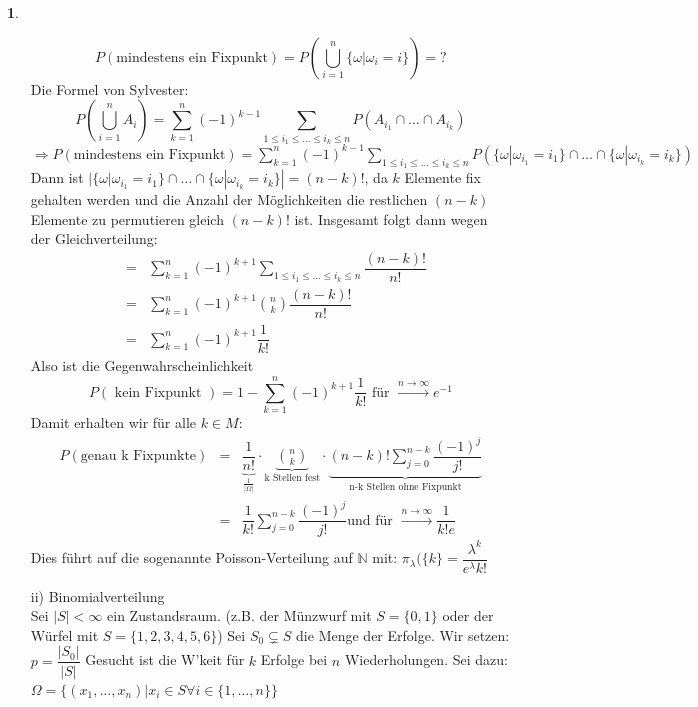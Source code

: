 \documentclass[10pt,a4paper]{report}
\numberwithin{equation}{section}
\numberwithin{figure}{section}
\theoremstyle{plain}
\theoremstyle{definition}
\newtheorem{example}[thm]{\protect\examplename}
\theoremstyle{remark}
\theoremstyle{plain}
\providecommand{\examplename}{Beispiel}
\newcommand{\1}{ \mathbb{1} } %
\begin{document}
\begin{example}
\begin{itemize}
    \[P(\text{mindestens ein Fixpunkt})=P\left(\bigcup\limits_{i=1}^n \{\omega|\omega_i=i\}\right)=?\]
    Die Formel von Sylvester:
    \[P\left(\bigcup\limits_{i=1}^nA_i\right)=\sum\limits_{k=1}^n(-1)^{k-1}\sum\limits_{1\leq i_1 \leq \dots \leq i_k \leq n}P(A_{i_1}\cap\dots\cap A_{i_k})\]
    $\Rightarrow P(\text{mindestens ein Fixpunkt})
    =\sum\limits_{k=1}^n(-1)^{k-1}\sum\limits_{1\leq i_1 \leq \dots \leq i_k \leq n}P(\{\omega|\omega_{i_1}=i_1\}\cap\dots\cap \{\omega|\omega_{i_k}=i_k\})$
    Dann ist $|\{\omega|\omega_{i_1}=i_1\}\cap\dots\cap
    \{\omega|\omega_{i_k}=i_k\}|=(n-k)!$, da $k$ Elemente fix gehalten
    werden und die Anzahl der Möglichkeiten die restlichen $(n-k)$
    Elemente zu permutieren gleich $(n-k)!$ ist. Insgesamt folgt dann
    wegen der Gleichverteilung:
    \begin{eqnarray*}
      &=&\sum\limits_{k=1}^n(-1)^{k+1}\sum\limits_{1\leq i_1 \leq \dots \leq i_k \leq n}\dfrac{(n-k)!}{n!}\\
      &=&\sum\limits_{k=1}^n(-1)^{k+1}\binom{n}{k}\dfrac{(n-k)!}{n!}\\
      &=&\sum\limits_{k=1}^n(-1)^{k+1}\dfrac{1}{k!}
    \end{eqnarray*}
    Also ist die Gegenwahrscheinlichkeit
    \[P(\text{ kein Fixpunkt })=1-\sum\limits_{k=1}^n(-1)^{k+1}\dfrac{1}{k!}\text{ für } \overset{n \to \infty}{\rightarrow} e^{-1}\]
    Damit erhalten wir für alle $k \in M$:
    \begin{eqnarray*}
      P(\text{genau k
        Fixpunkte})&=&\underbrace{\dfrac{1}{n!}}_\frac{1}{|\Omega|}\cdot
      \underbrace{\binom{n}{k}}_{\text{k Stellen fest}}\cdot
      \underbrace{(n-k)!\sum\limits_{j=0}^{n-k}\dfrac{(-1)^j}{j!}}_{\text{n-k
          Stellen ohne Fixpunkt}} \\
      &=&\dfrac{1}{k!}\sum\limits_{j=0}^{n-k}\dfrac{(-1)^j}{j!}\text{
        und für }\overset{n \to \infty}{\rightarrow} \dfrac{1}{k!e}
    \end{eqnarray*}
    Dies führt auf die sogenannte Poisson-Verteilung auf $\mathbb{N}$ mit: $\pi_\lambda(\{k\}=\dfrac{\lambda^k}{e^\lambda k!}$
  \item[ii)] Binomialverteilung\\
    Sei $|S|<\infty$ ein Zustandsraum. (z.B. der Münzwurf mit $S=\{0,1\}$ oder der Würfel mit $S=\{1,2,3,4,5,6\}$)
    Sei $S_0 \subsetneq S$ die Menge der Erfolge. Wir setzen:
    $p=\dfrac{|S_0|}{|S|}$
    Gesucht ist die W'keit für $k$ Erfolge bei $n$ Wiederholungen. Sei  dazu:
    $\Omega=\{(x_1,\dots,x_n)|x_i \in S \forall i \in \{1,\dots,n\}\}$

\end{itemize}
\end{example}
\end{document}
